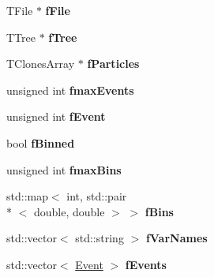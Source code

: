 \begin{DoxyCompactItemize}
\item 
\hypertarget{class_root_reader_a75af1a876b73e6833bdc6b254d65335b}{T\-File $\ast$ {\bfseries f\-File}}\label{class_root_reader_a75af1a876b73e6833bdc6b254d65335b}

\item 
\hypertarget{class_root_reader_ae3a20a6601087cecc748c4b50b94392f}{T\-Tree $\ast$ {\bfseries f\-Tree}}\label{class_root_reader_ae3a20a6601087cecc748c4b50b94392f}

\item 
\hypertarget{class_root_reader_a9c22fe9aa23f6c4299d534aad9b240ce}{T\-Clones\-Array $\ast$ {\bfseries f\-Particles}}\label{class_root_reader_a9c22fe9aa23f6c4299d534aad9b240ce}

\item 
\hypertarget{class_root_reader_a801a92cd6cd00322d0a89d5588132d10}{unsigned int {\bfseries fmax\-Events}}\label{class_root_reader_a801a92cd6cd00322d0a89d5588132d10}

\item 
\hypertarget{class_root_reader_a0e7cabbf6cd0878361886d76f48e5e79}{unsigned int {\bfseries f\-Event}}\label{class_root_reader_a0e7cabbf6cd0878361886d76f48e5e79}

\item 
\hypertarget{class_root_reader_a1b113b9995014a846c6096cb4e11eee2}{bool {\bfseries f\-Binned}}\label{class_root_reader_a1b113b9995014a846c6096cb4e11eee2}

\item 
\hypertarget{class_root_reader_a4dd8f02a657443032c57c90d07228aef}{unsigned int {\bfseries fmax\-Bins}}\label{class_root_reader_a4dd8f02a657443032c57c90d07228aef}

\item 
\hypertarget{class_root_reader_a46ba47478d9bcff794d0f6da72bd7173}{std\-::map$<$ int, std\-::pair\\*
$<$ double, double $>$ $>$ {\bfseries f\-Bins}}\label{class_root_reader_a46ba47478d9bcff794d0f6da72bd7173}

\item 
\hypertarget{class_root_reader_a2e494bd9033ff06a094069f69e885dcf}{std\-::vector$<$ std\-::string $>$ {\bfseries f\-Var\-Names}}\label{class_root_reader_a2e494bd9033ff06a094069f69e885dcf}

\item 
\hypertarget{class_root_reader_a4d54f4f3c26a75228e85af056f854994}{std\-::vector$<$ \hyperlink{class_event}{Event} $>$ {\bfseries f\-Events}}\label{class_root_reader_a4d54f4f3c26a75228e85af056f854994}

\end{DoxyCompactItemize}


